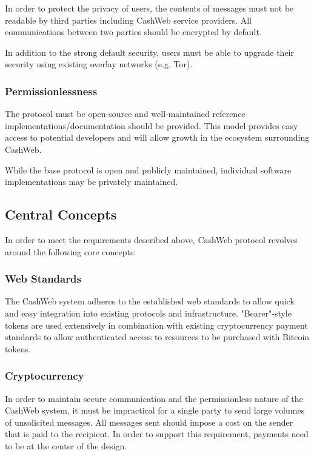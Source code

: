 \documentclass{article}
\begin{document}
In order to protect the privacy of users, the contents of messages must not be readable by third parties including CashWeb service providers. All communications between two parties should be encrypted by default.

In addition to the strong default security, users must be able to upgrade their security using existing overlay networks (e.g. Tor).

\subsubsection{Permissionlessness}

The protocol must be open-source and well-maintained reference implementations/documentation should be provided. This model provides easy access to potential developers and will allow growth in the ecosystem surrounding CashWeb.

While the base protocol is open and publicly maintained, individual software implementations may be privately maintained.

\subsection{Central Concepts} %

In order to meet the requirements described above, CashWeb protocol revolves around the following core concepts:

\subsubsection{Web Standards}

The CashWeb system adheres to the established web standards to allow quick and easy integration into existing protocols and infrastructure. "Bearer"-style tokens are used extensively in combination with existing cryptocurrency payment standards to allow authenticated access to resources to be purchased with Bitcoin tokens.

\subsubsection{Cryptocurrency}

In order to maintain secure communication and the permissionless nature of the CashWeb system, it must be impractical for a single party to send large volumes of unsolicited messages. All messages sent should impose a cost on the sender that is paid to the recipient. In order to support this requirement, payments need to be at the center of the design.
\end{document}
